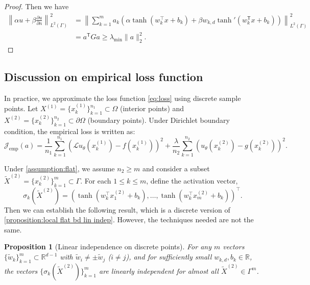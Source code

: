\documentclass{article}
\newtheorem{proposition}{Proposition}
\newcommand{\T}{\mathsf{T}}
\begin{document}
\begin{proof}
Then we have
\begin{equation}
    \begin{aligned}
\left\|\alpha u+\beta \frac{\partial u}{\partial n}\right\|_{L^{2}(\Gamma)}^2 &= \left\|\sum_{k=1}^{m}a_k\left(\alpha \tanh(w_k^\top x + b_k)+\beta w_{k,d} \tanh'(w_k^\T x+b_k)\right)\right\|_{L^{2}(\Gamma)}^2 \\
&= a^\T G a \ge \lambda_{\text{min}} \|a\|_{2}^2 .
    \end{aligned}
\end{equation}
\end{proof}


\subsection{Discussion on empirical loss function}\label{sec:empirical loss}
In practice, we approximate the loss function \eqref{eq:loss} using discrete sample points. 
Let \(X^{(1)} = \{x_k^{(1)}\}_{k=1}^{n_1} \subset \Omega\) (interior points) and \(X^{(2)} = \{x_k^{(2)}\}_{k=1}^{n_2} \subset \partial\Omega\) (boundary points). 
Under Dirichlet boundary condition, the empirical loss is written as:
\begin{equation}
\mathcal{J}_{\text{emp}}(a) = \frac{1}{n_1}\sum_{k=1}^{n_1} \left(\mathcal{L}u_\theta(x_k^{(1)}) - f(x_k^{(1)})\right)^2 + \frac{\lambda}{n_2}\sum_{k=1}^{n_2} \left(u_\theta(x_k^{(2)}) - g(x_k^{(2)})\right)^2 .\label{eq:empirical_loss}
\end{equation}


Under \cref{assumption:flat}, we assume \(n_2 \geq m\) and consider a subset \(\tilde{X}^{(2)} = \{x_k^{(2)}\}_{k=1}^m \subset \Gamma\). For each \(1 \leq k \leq m\), define the activation vector,
\begin{equation*}
\sigma_k(\tilde{X}^{(2)}) = \left(\tanh(w_k^\top x_1^{(2)} + b_k), \dots, \tanh(w_k^\top x_m^{(2)} + b_k)\right)^\top .
\end{equation*}
Then we can establish the following result, which is a discrete version of \cref{proposition:local flat bd lin indep}. 
However, the techniques needed are not the same.
\begin{proposition}[Linear independence on discrete points]\label{proposition:discrete_independence}  
For any \(m\) vectors \(\{\tilde{w}_k\}_{k=1}^m \subset \mathbb{R}^{d-1}\) with \(\tilde{w}_i \neq \pm\tilde{w}_j\) (\(i \neq j\)), and for sufficiently small \(w_{k,d}, b_k \in \mathbb{R}\), the vectors \(\{\sigma_k(\tilde{X}^{(2)})\}_{k=1}^m\) are linearly independent for almost all \(\tilde{X}^{(2)} \in \Gamma^m\).
\end{proposition}
\end{document}
